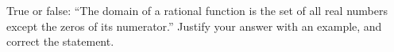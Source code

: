 True or false: ``The domain of a rational function is the set of all real numbers except the zeros of its numerator.'' Justify your answer with an example, and correct the statement.
